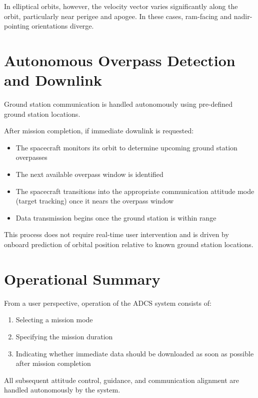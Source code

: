 In elliptical orbits, however, the velocity vector varies significantly along the orbit, particularly near perigee and apogee. In these cases, ram-facing and nadir-pointing orientations diverge.

\section{Autonomous Overpass Detection and Downlink}

Ground station communication is handled autonomously using pre-defined ground station locations.

After mission completion, if immediate downlink is requested:

\begin{itemize}
	\item The spacecraft monitors its orbit to determine upcoming ground station overpasses
	\item The next available overpass window is identified
	\item The spacecraft transitions into the appropriate communication attitude mode (target tracking) once it nears the overpass window
	\item Data transmission begins once the ground station is within range
\end{itemize}

This process does not require real-time user intervention and is driven by onboard prediction of orbital position relative to known ground station locations.

\section{Operational Summary}

From a user perspective, operation of the ADCS system consists of:

\begin{enumerate}
	\item Selecting a mission mode
	\item Specifying the mission duration
	\item Indicating whether immediate data should be downloaded as soon as possible after mission completion
\end{enumerate}

All subsequent attitude control, guidance, and communication alignment are handled autonomously by the system.
